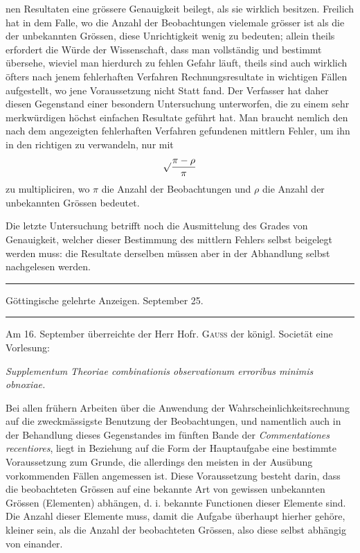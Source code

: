 %
nen Resultaten eine grössere Genauigkeit beilegt, als sie wirklich besitzen. Freilich hat in dem Falle, wo die Anzahl der Beobachtungen vielemale grösser ist als die der unbekannten Grössen, diese Unrichtigkeit wenig zu bedeuten; allein theils erfordert die Würde der Wissenschaft, dass man vollständig und bestimmt übersehe, wieviel man hierdurch zu fehlen Gefahr läuft, theils sind auch wirklich öfters nach jenem fehlerhaften Verfahren Rechnungsresultate in wichtigen Fällen aufgestellt, wo jene Voraussetzung nicht Statt fand. Der Verfasser hat daher diesen Gegenstand einer besondern Untersuchung unterworfen, die zu einem sehr merkwürdigen höchst einfachen Resultate geführt hat. Man braucht nemlich den nach dem angezeigten fehlerhaften Verfahren gefundenen mittlern Fehler, um ihn in den richtigen zu verwandeln, nur mit
\[
\surd\frac{\pi-\rho}{\pi}
\]
zu multipliciren, wo \(\pi\) die Anzahl der Beobachtungen und \(\rho\) die Anzahl der unbekannten Grössen bedeutet.

Die letzte Untersuchung betrifft noch die Ausmittelung des Grades von Genauigkeit, welcher dieser Bestimmung des mittlern Fehlers selbst beigelegt werden muss: die Resultate derselben müssen aber in der Abhandlung selbst nachgelesen werden.

\par\bigskip
\begin{center}
\rule{.88\textwidth}{.3pt}\par
Göttingische gelehrte Anzeigen. September 25.\par
\rule{.88\textwidth}{.3pt}
\end{center}

Am 16. September überreichte der Herr Hofr. \textsc{Gauss} der königl. Societät eine Vorlesung:
\begin{center}
\textit{Supplementum Theoriae combinationis observationum erroribus minimis obnoxiae.}
\end{center}
\noindent Bei allen frühern Arbeiten über die Anwendung der Wahrscheinlichkeitsrechnung auf die zweckmässigste Benutzung der Beobachtungen, und namentlich auch in der Behandlung dieses Gegenstandes im fünften Bande der \textit{Commentationes recentiores}, liegt in Beziehung auf die Form der Hauptaufgabe eine bestimmte Voraussetzung zum Grunde, die allerdings den meisten in der Ausübung vorkommenden Fällen angemessen ist. Diese Voraussetzung besteht darin, dass die beobachteten Grössen auf eine bekannte Art von gewissen unbekannten Grössen (Elementen) abhängen, d. i. bekannte Functionen dieser Elemente sind. Die Anzahl dieser Elemente muss, damit die Aufgabe überhaupt hierher gehöre, kleiner sein, als die Anzahl der beobachteten Grössen, also diese selbst abhängig von einander.

